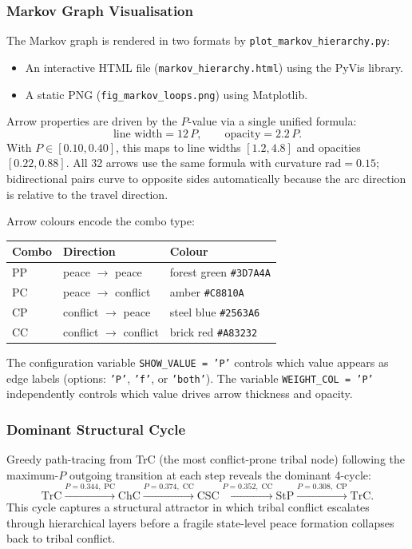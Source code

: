 \subsubsection*{Markov Graph Visualisation}

The Markov graph is rendered in two formats by \texttt{plot\_markov\_hierarchy.py}:
\begin{itemize}
    \item An interactive HTML file (\texttt{markov\_hierarchy.html}) using
          the PyVis library.
    \item A static PNG (\texttt{fig\_markov\_loops.png}) using Matplotlib.
\end{itemize}

Arrow properties are driven by the $P$-value via a single unified formula:
\begin{equation}
    \text{line width} = 12\,P,
    \qquad
    \text{opacity} = 2.2\,P.
\end{equation}
With $P \in [0.10, 0.40]$, this maps to line widths $[1.2, 4.8]$ and
opacities $[0.22, 0.88]$.  All 32 arrows use the same formula with curvature
$\text{rad} = 0.15$; bidirectional pairs curve to opposite sides automatically
because the arc direction is relative to the travel direction.

Arrow colours encode the combo type:
\begin{center}
\begin{tabular}{lll}
\toprule
Combo & Direction & Colour \\
\midrule
PP & peace $\to$ peace     & forest green \texttt{\#3D7A4A} \\
PC & peace $\to$ conflict  & amber \texttt{\#C8810A} \\
CP & conflict $\to$ peace  & steel blue \texttt{\#2563A6} \\
CC & conflict $\to$ conflict & brick red \texttt{\#A83232} \\
\bottomrule
\end{tabular}
\end{center}

The configuration variable \texttt{SHOW\_VALUE = 'P'} controls which
value appears as edge labels (options: \texttt{'P'}, \texttt{'f'}, or
\texttt{'both'}).  The variable \texttt{WEIGHT\_COL = 'P'} independently
controls which value drives arrow thickness and opacity.

\subsubsection*{Dominant Structural Cycle}

Greedy path-tracing from TrC (the most conflict-prone tribal node)
following the maximum-$P$ outgoing transition at each step reveals
the dominant 4-cycle:
\begin{equation}
    \text{TrC} \xrightarrow{P=0.344,\;\text{PC}} \text{ChC}
    \xrightarrow{P=0.374,\;\text{CC}} \text{CSC}
    \xrightarrow{P=0.352,\;\text{CC}} \text{StP}
    \xrightarrow{P=0.308,\;\text{CP}} \text{TrC}.
    \label{eq:dominant_cycle}
\end{equation}
This cycle captures a structural attractor in which tribal conflict escalates
through hierarchical layers before a fragile state-level peace formation
collapses back to tribal conflict.
